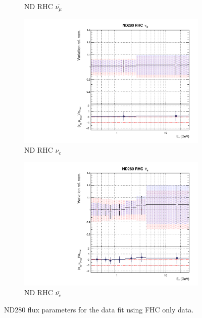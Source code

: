 \begin{figure}[t]
\begin{subfigure}{0.45\textwidth}
  \caption{ND RHC $\bar{\nu_{\mu}}$}
\end{subfigure}
\begin{subfigure}{0.45\textwidth}
  \centering
  \includegraphics[width=0.75\linewidth]{figs/rhcmpdat248flux_6}
  \caption{ND RHC $\nu_{e}$}
\end{subfigure}
\begin{subfigure}{0.45\textwidth}
  \centering
  \includegraphics[width=0.75\linewidth]{figs/rhcmpdat248flux_7}
  \caption{ND RHC $\bar{\nu_e}$}
\end{subfigure}
\caption{ND280 flux parameters for the data fit using FHC only data.}
\label{fig:rhcmpidat248fluxND}
\end{figure}

